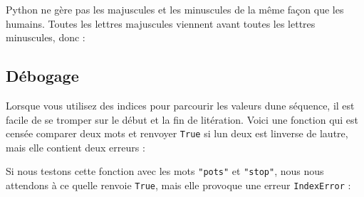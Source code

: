 Python ne gère pas les majuscules et les minuscules de la même façon que
les humains. Toutes les lettres majuscules viennent avant toutes les
lettres minuscules, donc :

\begin{Shaded}
\begin{Highlighting}[]
\end{Highlighting}
\end{Shaded}

\hypertarget{duxe9bogage}{%
\subsection{Débogage}\label{duxe9bogage}}

Lorsque vous utilisez des indices pour parcourir les valeurs
d\textquotesingle une séquence, il est facile de se tromper sur le début
et la fin de l\textquotesingle itération. Voici une fonction qui est
censée comparer deux mots et renvoyer \texttt{True} si
l\textquotesingle un d\textquotesingle eux est l\textquotesingle inverse
de l\textquotesingle autre, mais elle contient deux erreurs :

\begin{Shaded}
\begin{Highlighting}[]
     \OperatorTok{!=} 
         

\OperatorTok{=} 
\OperatorTok{=} 

    \OperatorTok{\textgreater{}} \NormalTok{:}
        \OperatorTok{!=}
             
\OperatorTok{=}\OperatorTok{+} 
\OperatorTok{=}\OperatorTok{{-}} 

     
\end{Highlighting}
\end{Shaded}

Si nous testons cette fonction avec les mots \texttt{"pots"} et
\texttt{"stop"}, nous nous attendons à ce qu\textquotesingle elle
renvoie \texttt{True}, mais elle provoque une erreur \texttt{IndexError}
:

